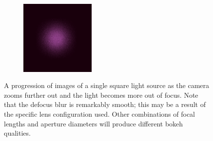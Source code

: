 \documentclass[twocolumn]{article}
\begin{document}
\begin{figure}
\begin{subfigure}[b]{.3\textwidth}
    \end{subfigure} \\
    \begin{subfigure}[b]{.3\textwidth}
        \includegraphics[width=\textwidth]{img/magenta_square_3.png}
    \end{subfigure}
    \caption{A progression of images of a single square light source as the
    camera zooms further out and the light becomes more out of focus. Note that
    the defocus blur is remarkably smooth; this may be a result of the specific lens
    configuration used. Other combinations of focal lengths and aperture diameters
    will produce different bokeh qualities.}
    \label{fig:magenta_square}
\end{figure}
\end{document}
